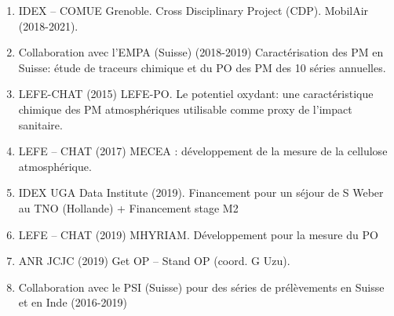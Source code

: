 \begin{enumerate}
    \item IDEX – COMUE Grenoble. Cross Disciplinary Project (CDP). MobilAir (2018-2021).
    \item Collaboration avec l’EMPA (Suisse) (2018-2019) Caractérisation des PM en Suisse: étude de traceurs chimique et du PO des PM des 10 séries annuelles. 
    \item LEFE-CHAT (2015) LEFE-PO. Le potentiel oxydant: une caractéristique chimique des PM atmosphériques utilisable comme proxy de l’impact sanitaire. 
    \item LEFE – CHAT (2017) MECEA : développement de la mesure de la cellulose atmosphérique.
    \item IDEX UGA Data Institute (2019). Financement pour un séjour de S Weber au TNO (Hollande) + Financement stage M2
    \item LEFE – CHAT (2019) MHYRIAM. Développement pour la mesure du PO 
    \item ANR JCJC (2019) Get OP – Stand OP (coord. G Uzu). 
    \item Collaboration avec le PSI (Suisse) pour des séries de prélèvements en Suisse et en Inde (2016-2019)
\end{enumerate}

